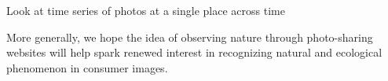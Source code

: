 Look at time series of photos at a single place across time 

More generally, we hope
the idea of observing nature through photo-sharing websites will help
spark renewed interest in recognizing natural and ecological phenomenon in
consumer images.



 






